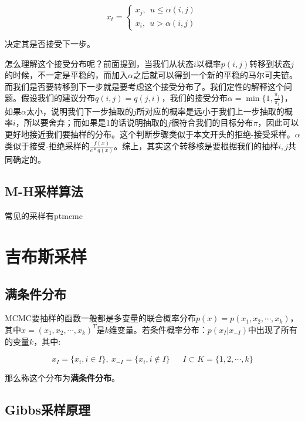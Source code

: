 \[x_t=
\left\{
\begin{aligned}
x_j,\ \ u\leq\alpha(i,j) \\
x_i, \ \ u  > \alpha(i,j)
\end{aligned}
\right.\]

决定其是否接受下一步。

怎么理解这个接受分布呢？前面提到，当我们从状态\(i\)以概率\(p(i,j)\)转移到状态\(j\)的时候，不一定是平稳的，而加入\(\alpha\)之后就可以得到一个新的平稳的马尔可夫链。而我们是否要转移到下一步就是要考虑这个接受分布了。我们定性的解释这个问题。假设我们的建议分布\(q(i,j)=q(j,i)\)，我们的接受分布\(\alpha=\min\{1,\frac{\pi_j}{\pi_i}\}\)，如果\(\alpha\)太小，说明我们下一步抽取的\(j\)所对应的概率是远小于我们上一步抽取的概率\(i\)，所以要舍弃；而如果是1的话说明抽取的\(j\)很符合我们的目标分布\(\pi\)，因此可以更好地接近我们要抽样的分布。这个判断步骤类似于本文开头的拒绝-接受采样。\(\alpha\)类似于接受-拒绝采样的\(\frac{f(x)}{c*q(x)}\)。综上，其实这个转移核是要根据我们的抽样\(i,j\)共同确定的。
\subsection{M-H采样算法}

\begin{figure}
\centering
\caption{}
\end{figure}
常见的采样有ptmcmc\cite{justin_ellis_2017_1037579}

\section{吉布斯采样}

\subsection{满条件分布}

MCMC要抽样的函数一般都是多变量的联合概率分布\(p(x)=p(x_1,x_2,\cdots,x_k)\)，其中\(x=(x_1,x_2,\cdots,x_k)^T\)是\(k\)维变量。若条件概率分布：\(p(x_I|x_{-I})\)中出现了所有的变量\(k\)，其中:

\[x_I=\{x_{i},i\in I\},\ x_{-I}=\{x_{i},i\notin I\}\ \ \  \ \ \  \ I\subset K=\{1,2,\cdots,k\}\]

那么称这个分布为\textbf{满条件分布}。
\subsection{Gibbs采样原理}

